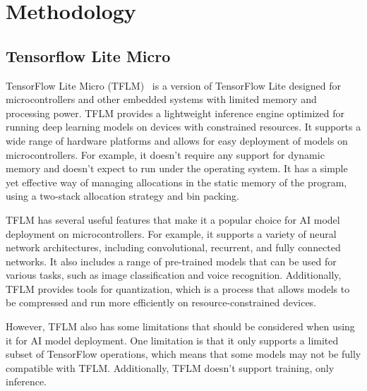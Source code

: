 
\chapter{Methodology} \label{Chapter 3}

\section{Tensorflow Lite Micro}

TensorFlow Lite Micro (TFLM)~\cite{tflm} is a version of TensorFlow Lite designed for microcontrollers and other embedded systems with limited memory and processing power. TFLM provides a lightweight inference engine optimized for running deep learning models on devices with constrained resources. It supports a wide range of hardware platforms and allows for easy deployment of models on microcontrollers. For example, it doesn't require any support for dynamic memory and doesn't expect to run under the operating system. It has a simple yet effective way of managing allocations in the static memory of the program, using a two-stack allocation strategy and bin packing.%

TFLM has several useful features that make it a popular choice for AI model deployment on microcontrollers. For example, it supports a variety of neural network architectures, including convolutional, recurrent, and fully connected networks. It also includes a range of pre-trained models that can be used for various tasks, such as image classification and voice recognition. Additionally, TFLM provides tools for quantization, which is a process that allows models to be compressed and run more efficiently on resource-constrained devices.

However, TFLM also has some limitations that should be considered when using it for AI model deployment. One limitation is that it only supports a limited subset of TensorFlow operations, which means that some models may not be fully compatible with TFLM. Additionally, TFLM doesn't support training, only inference.


